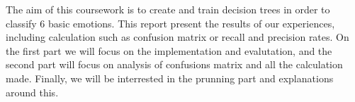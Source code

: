 The aim of this coursework is to create and train decision trees in order to classify 6 basic emotions.
This report present the results of our experiences, including calculation such as confusion matrix or
recall and precision rates. 
On the first part we will focus on the implementation and evalutation, and the second part will focus on
analysis of confusions matrix and all the calculation made. 
Finally, we will be interrested in the prunning part and explanations around this. 
